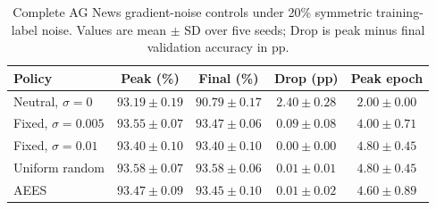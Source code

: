 \begin{table}[H]
\centering
\caption{Complete AG News gradient-noise controls under 20\% symmetric
training-label noise. Values are mean $\pm$ SD over five seeds; Drop is peak
minus final validation accuracy in pp.}
\label{tab:appendix-agnews-controls}
\scriptsize
\setlength{\tabcolsep}{3.2pt}
\renewcommand{\arraystretch}{1.03}
\begin{tabular}{lcccc}
\toprule
Policy & Peak (\%) & Final (\%) & Drop (pp) & Peak epoch \\
\midrule
Neutral, $\sigma=0$ & $93.19\pm0.19$ & $90.79\pm0.17$ & $2.40\pm0.28$ & $2.00\pm0.00$ \\
Fixed, $\sigma=0.005$ & $93.55\pm0.07$ & $93.47\pm0.06$ & $0.09\pm0.08$ & $4.00\pm0.71$ \\
Fixed, $\sigma=0.01$ & $93.40\pm0.10$ & $93.40\pm0.10$ & $0.00\pm0.00$ & $4.80\pm0.45$ \\
Uniform random & $93.58\pm0.07$ & $93.58\pm0.06$ & $0.01\pm0.01$ & $4.80\pm0.45$ \\
AEES & $93.47\pm0.09$ & $93.45\pm0.10$ & $0.01\pm0.02$ & $4.60\pm0.89$ \\
\bottomrule
\end{tabular}
\end{table}
